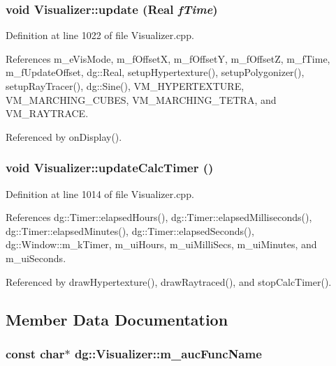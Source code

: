 \subsubsection{\setlength{\rightskip}{0pt plus 5cm}void Visualizer::update ({\bf Real} {\em f\-Time})\hspace{0.3cm}{\tt  [protected]}}\label{classdg_1_1Visualizer_b11}




Definition at line 1022 of file Visualizer.cpp.

References m\_\-e\-Vis\-Mode, m\_\-f\-Offset\-X, m\_\-f\-Offset\-Y, m\_\-f\-Offset\-Z, m\_\-f\-Time, m\_\-f\-Update\-Offset, dg::Real, setup\-Hypertexture(), setup\-Polygonizer(), setup\-Ray\-Tracer(), dg::Sine(), VM\_\-HYPERTEXTURE, VM\_\-MARCHING\_\-CUBES, VM\_\-MARCHING\_\-TETRA, and VM\_\-RAYTRACE.

Referenced by on\-Display().
\subsubsection{\setlength{\rightskip}{0pt plus 5cm}void Visualizer::update\-Calc\-Timer ()\hspace{0.3cm}{\tt  [protected]}}\label{classdg_1_1Visualizer_b9}




Definition at line 1014 of file Visualizer.cpp.

References dg::Timer::elapsed\-Hours(), dg::Timer::elapsed\-Milliseconds(), dg::Timer::elapsed\-Minutes(), dg::Timer::elapsed\-Seconds(), dg::Window::m\_\-k\-Timer, m\_\-ui\-Hours, m\_\-ui\-Milli\-Secs, m\_\-ui\-Minutes, and m\_\-ui\-Seconds.

Referenced by draw\-Hypertexture(), draw\-Raytraced(), and stop\-Calc\-Timer().

\subsection{Member Data Documentation}
\subsubsection{\setlength{\rightskip}{0pt plus 5cm}const char$\ast$ dg::Visualizer::m\_\-auc\-Func\-Name\hspace{0.3cm}{\tt  [protected]}}\label{classdg_1_1Visualizer_n52}




